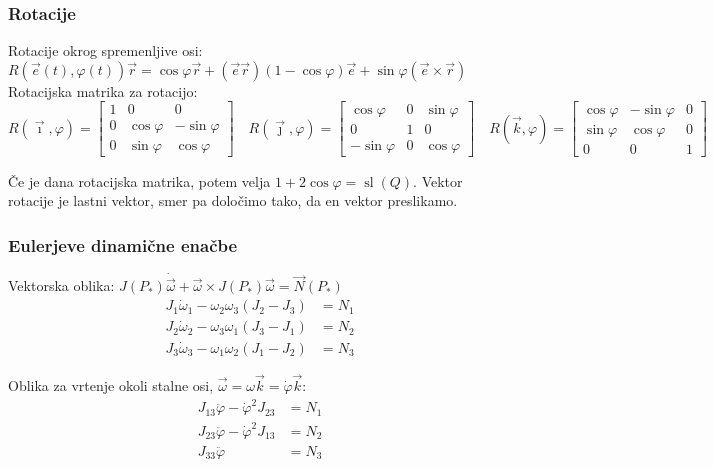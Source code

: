\documentclass[a4paper,10pt]{article}
\theoremstyle{definition}
\newcommand{\vomega}{\vec{\omega}}
\newcommand{\domega}{\dot{\vomega}}
\newcommand{\vr}{\vec{r}}
\newcommand{\Pt}{P_{\ast}}
\begin{document}
\subsubsection*{Rotacije}
Rotacije okrog spremenljive osi:
$R(\vec{e}(t),\varphi(t))\vr = \cos\varphi\vr +
(\vec{e}\vec{r})(1-\cos\varphi)\vec{e} + \sin\varphi(\vec{e} \times \vr)$ \\
Rotacijska matrika za rotacijo: \\
\[
  R(\vec{\imath}, \varphi) =
  \begin{bmatrix}
    1 & 0 & 0 \\
    0 & \cos\varphi & -\sin\varphi \\
    0 & \sin\varphi & \cos\varphi
  \end{bmatrix} \quad
  R(\vec{\jmath}, \varphi) =
  \begin{bmatrix}
    \cos\varphi & 0 & \sin\varphi  \\
    0           & 1 & 0   \\
    -\sin\varphi & 0 & \cos\varphi
  \end{bmatrix} \quad
  R(\vec{k}, \varphi) =
  \begin{bmatrix}
    \cos\varphi & -\sin\varphi & 0 \\
    \sin\varphi & \cos\varphi & 0 \\
    0 & 0 & 1
  \end{bmatrix}
\]

Če je dana rotacijska matrika, potem velja $1 + 2\cos\varphi =
\operatorname{sl}(Q)$. Vektor rotacije je lastni vektor, smer pa določimo tako,
da en vektor preslikamo.

\subsubsection*{Eulerjeve dinamične enačbe}
Vektorska oblika: $J(\Pt)\domega + \vomega \times J(\Pt)\vomega =
\vec{N}(\Pt)$
\begin{align*}
  J_1\dot{\omega}_1 - \omega_2\omega_3(J_2 - J_3) &= N_1 \\
  J_2\dot{\omega}_2 - \omega_3\omega_1(J_3 - J_1) &= N_2 \\
  J_3\dot{\omega}_3 - \omega_1\omega_2(J_1 - J_2) &= N_3
\end{align*}

Oblika za vrtenje okoli stalne osi, $\vomega = \omega \vec{k} = \dot{\varphi} \vec{k}$:
\begin{align*}
  J_{13} \ddot{\varphi} - \dot{\varphi}^2 J_{23} &= N_1 \\
  J_{23} \ddot{\varphi} - \dot{\varphi}^2 J_{13} &= N_2 \\
  J_{33} \ddot{\varphi}  &= N_3
\end{align*}
\end{document}
